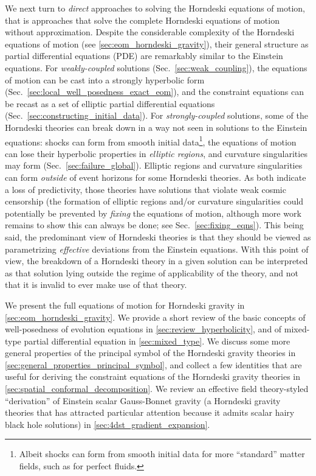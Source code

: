 \documentclass{ws-ijmpd}
\begin{document}
We next turn to \emph{direct} approaches to solving the Horndeski
equations of motion, that is approaches that solve the complete
Horndeski equations of motion without approximation.
Despite the considerable complexity of the Horndeski equations
of motion (see \ref{sec:eom_horndeski_gravity}), 
their general structure as partial differential equations (PDE) 
are remarkably similar to the Einstein 
equations\cite{Kovacs:2020pns,Kovacs:2020ywu,
Kovacs:2021lgk,Kovacs:2021vdk,Reall:2021voz}. 
For \emph{weakly-coupled} solutions (Sec.~\ref{sec:weak_coupling}),
the equations of motion can be cast
into a strongly hyperbolic form (Sec.~\ref{sec:local_well_posedness_exact_eom}),
and the constraint equations can be recast as a set of elliptic
partial differential equations (Sec.~\ref{sec:constructing_initial_data}).
For \emph{strongly-coupled} solutions, some of the Horndeski theories 
can break down in a way  
not seen in solutions to the Einstein equations:
shocks can form from smooth initial data\footnote{Albeit shocks can 
form from smooth initial data 
for more ``standard'' matter fields, such
as for perfect fluids\cite{rezzolla2013relativistic}.},
the equations of motion can lose their hyperbolic properties 
in \emph{elliptic regions}, and curvature singularities
may form (Sec.~\ref{sec:failure_global}).
Elliptic regions and curvature singularities can form \emph{outside}
of event horizons for some Horndeski theories.
As both indicate a loss of predictivity, those theories
have solutions that violate 
weak cosmic censorship\cite{Ripley:2019hxt,Ripley:2019irj,
Figueras:2020dzx,East:2021bqk} (the formation of elliptic
regions and/or curvature singularities 
could potentially be prevented by \emph{fixing} the equations
of motion, although more work remains to show this can always be done; 
see Sec.~\ref{sec:fixing_eqns}).
This being said, the predominant view of Horndeski theories is that they
should be viewed as parametrizing \emph{effective} deviations from
the Einstein equations. 
With this point of view, the breakdown of a Horndeski
theory in a given solution can be interpreted as that solution lying outside
the regime of applicability of the theory, 
and not that it is invalid to ever make use of that theory.

We present the full equations of motion for Horndeski gravity
in \ref{sec:eom_horndeski_gravity}. 
We provide a short review of the basic concepts of
well-posedness of evolution equations in
\ref{sec:review_hyperbolicity},
and of mixed-type partial differential equation in
\ref{sec:mixed_type}.
We discuss some more general properties
of the principal symbol of the Horndeski gravity theories
in \ref{sec:general_properties_principal_symbol}, and collect a few
identities that are useful for deriving the constraint equations of the
Horndeski gravity theories in \ref{sec:spatial_conformal_decomposition}.
We review an effective field
theory-styled ``derivation'' of Einstein scalar Gauss-Bonnet
gravity (a Horndeski gravity theories that has attracted particular
attention because it admits scalar hairy black hole solutions) in 
\ref{sec:4dst_gradient_expansion}.
\end{document}

